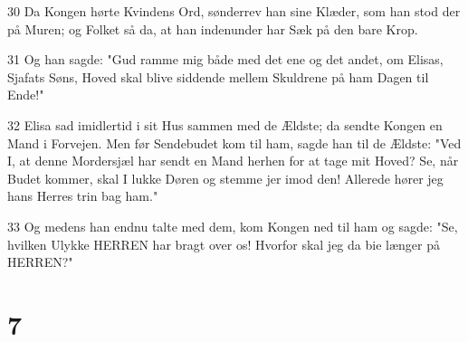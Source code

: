 \par 30 Da Kongen hørte Kvindens Ord, sønderrev han sine Klæder, som han stod der på Muren; og Folket så da, at han indenunder har Sæk på den bare Krop.
\par 31 Og han sagde: "Gud ramme mig både med det ene og det andet, om Elisas, Sjafats Søns, Hoved skal blive siddende mellem Skuldrene på ham Dagen til Ende!"
\par 32 Elisa sad imidlertid i sit Hus sammen med de Ældste; da sendte Kongen en Mand i Forvejen. Men før Sendebudet kom til ham, sagde han til de Ældste: "Ved I, at denne Mordersjæl har sendt en Mand herhen for at tage mit Hoved? Se, når Budet kommer, skal I lukke Døren og stemme jer imod den! Allerede hører jeg hans Herres trin bag ham."
\par 33 Og medens han endnu talte med dem, kom Kongen ned til ham og sagde: "Se, hvilken Ulykke HERREN har bragt over os! Hvorfor skal jeg da bie længer på HERREN?"

\chapter{7}

